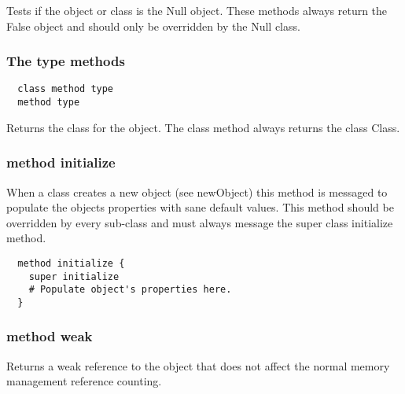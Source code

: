 Tests if the object or class is the Null object. These methods always return
the False object and should only be overridden by the Null class.

\hfill
\subsubsection {The type methods}
\begin{lstlisting}
  class method type
  method type
\end{lstlisting}

Returns the class for the object. The class method always returns the class
Class.

\hfill
\subsubsection {method initialize}
When a class creates a new object (see newObject) this method is messaged
to populate the objects properties with sane default values. This method
should be overridden by every sub-class and must always message the super
class initialize method.

\begin{lstlisting}
  method initialize {
    super initialize
    # Populate object's properties here.
  }
\end{lstlisting}

\subsubsection {method weak}

Returns a weak reference to the object that does not affect the normal memory
management reference counting.
